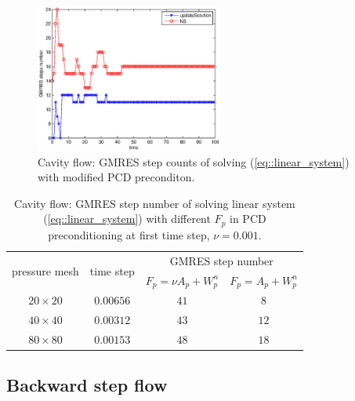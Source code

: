 \documentclass{eajam}
\begin{document}
       \begin{figure}[!htbp]
         \begin{center}
             \includegraphics[width = 0.55\textwidth, angle = 0]{picture/cavity_flow_data/NS_iterate_steps.eps}
        \end{center}
        \caption{\small Cavity flow: GMRES step counts of solving
          (\ref{eq::linear_system}) with modified PCD preconditon.}
        \label{fig::cavity_GMRES_steps}
       \end{figure}
       
       \begin{table}[!htbp]
         \centering
         \begin{tabular}{cccc}
           \toprule
           \multirow{2}{*}{pressure mesh}    & \multirow{2}{*}{time
             step} & \multicolumn{2}{c}{GMRES step number} \\
           \cline{3-4}
            &               & $F_p = \nu A_p + W_p^n$ & $F_p = A_p + W_p^n$ \\ \midrule
           $20 \times 20$   &   $0.00656$         &      $41$           &     $8$
           \\ \midrule
           $40 \times 40$   &   $0.00312$         &      $43$           &     $12$
           \\ \midrule       
           $80 \times 80$   &   $0.00153$   &      $48$    &     $18$
           \\ \bottomrule 
         \end{tabular}
         \caption{Cavity flow: GMRES step number of solving linear system
           (\ref{eq::linear_system}) with different $F_p$ in PCD
           preconditioning at first time step, $\nu = 0.001$.}
         \label{tab::GMRES_steps_initial}
       \end{table}
   \subsection{Backward step flow}
\end{document}
